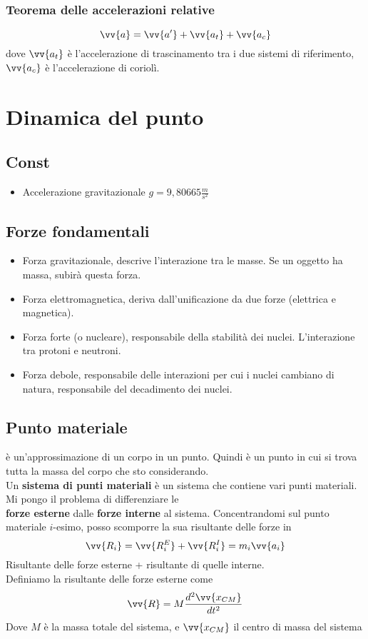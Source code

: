 \documentclass[a4paper]{report}
\begin{document}
  \subsection{Teorema delle accelerazioni relative}
  $$ \vv{a} = \vv{a'} + \vv{a_t} + \vv{a_c}$$
  dove $\vv{a_t}$ è l'accelerazione di trascinamento tra i due sistemi di riferimento, $\vv{a_c}$ è l'accelerazione di coriolì.


  \chapter{Dinamica del punto}

  \section{Const}
  \begin{itemize}
    \item Accelerazione gravitazionale $g = 9,80665 \frac{m}{s^2}$
  \end{itemize}

  \section{Forze fondamentali}
  \begin{itemize}
    \item Forza gravitazionale, descrive l'interazione tra le masse. Se un oggetto ha massa, subirà questa forza.
    \item Forza elettromagnetica, deriva dall'unificazione da due forze (elettrica e magnetica).
    \item Forza forte (o nucleare), responsabile della stabilità dei nuclei. L'interazione tra protoni e neutroni.
    \item Forza debole, responsabile delle interazioni per cui i nuclei cambiano di natura, responsabile del decadimento dei nuclei.
  \end{itemize}

  \section{Punto materiale}
  è un'approssimazione di un corpo in un punto. Quindi è un punto in cui si trova tutta la massa del corpo che sto considerando.\\
  Un \textbf{sistema di punti materiali} è un sistema che contiene vari punti materiali. Mi pongo il problema di differenziare le\\
  \textbf{forze esterne} dalle \textbf{forze interne} al sistema.
  Concentrandomi sul punto materiale $i$-esimo, posso scomporre la sua risultante delle forze in
  $$\vv{R_i} = \vv{R_i^{E}} + \vv{R_i^{I}} =  m_i \vv{a_i}$$
  Risultante delle forze esterne + risultante di quelle interne.\\
  Definiamo la risultante delle forze esterne come
  $$\vv{R} = M \frac{d^2\vv{x_{CM}}}{dt^2}$$
  Dove $M$ è la massa totale del sistema, e $\vv{x_{CM}}$ il centro di massa del sistema
\end{document}

